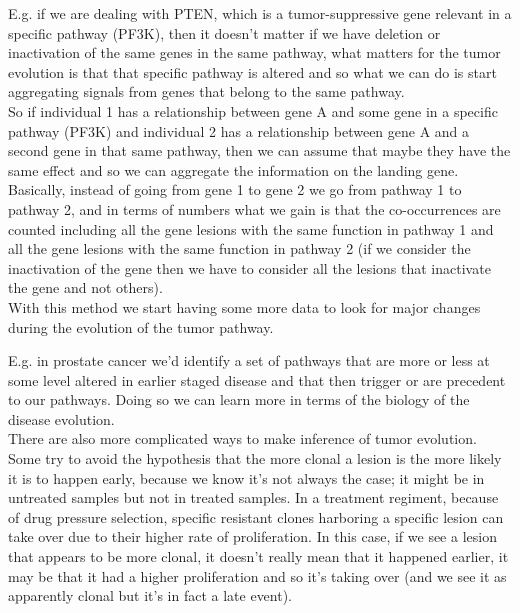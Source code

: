 E.g. if we are dealing with PTEN, which is a tumor-suppressive gene relevant in a specific pathway (PF3K), then it doesn't matter if we have deletion or inactivation of the same genes in the same pathway, what matters for the tumor evolution is that that specific pathway is altered and so what we can do is start aggregating signals from genes that belong to the same pathway.
\\
So if individual 1 has a relationship between gene A and some gene in a specific pathway (PF3K) and individual 2 has a relationship between gene A and a second gene in that same pathway, then we can assume that maybe they have the same effect and so we can aggregate the information on the landing gene.
\\
Basically, instead of going from gene 1 to gene 2 we go from pathway 1 to pathway 2, and in terms of numbers what we gain is that the co-occurrences are counted including all the gene lesions with the same function in pathway 1 and all the gene lesions with the same function in pathway 2 (if we consider the inactivation of the gene then we have to consider all the lesions that inactivate the gene and not others).
\\
With this method we start having some more data to look for major changes during the evolution of the tumor pathway.

E.g. in prostate cancer we'd identify a set of pathways that are more or less at some level altered in earlier staged disease and that then trigger or are precedent to our pathways. Doing so we can learn more in terms of the biology of the disease evolution.
\\
There are also more complicated ways to make inference of tumor evolution. Some try to avoid the hypothesis that the more clonal a lesion is the more likely it is to happen early, because we know it's not always the case; it might be in untreated samples but not in treated samples.
In a treatment regiment, because of drug pressure selection, specific resistant clones harboring a specific lesion can take over due to their higher rate of proliferation.
In this case, if we see a lesion that appears to be more clonal, it doesn't really mean that it happened earlier, it may be that it had a higher proliferation and so it's taking over (and we see it as apparently clonal but it's in fact a late event).


